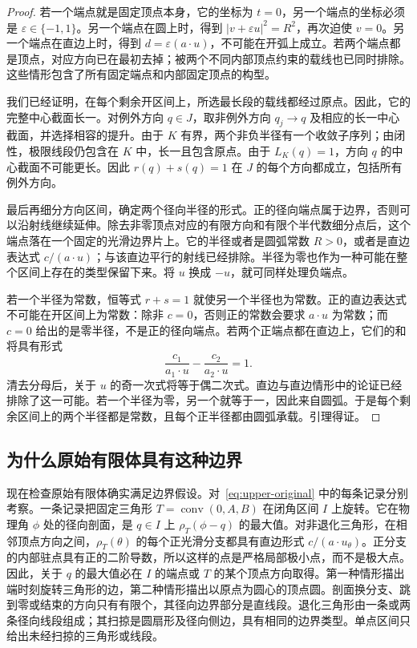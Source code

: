 \begin{proof}
若一个端点就是固定顶点本身，它的坐标为 $t=0$，另一个端点的坐标必须是 $\varepsilon\in\{-1,1\}$。另一个端点在圆上时，得到 $|v+\varepsilon u|^2=R^2$，再次迫使 $v=0$。另一个端点在直边上时，得到 $d=\varepsilon(a\cdot u)$，不可能在开弧上成立。若两个端点都是顶点，对应方向已在最初去掉；被两个不同内部顶点约束的载线也已同时排除。这些情形包含了所有固定端点和内部固定顶点的构型。

我们已经证明，在每个剩余开区间上，所选最长段的载线都经过原点。因此，它的完整中心截面长一。对例外方向 $q\in J$，取非例外方向 $q_j\to q$ 及相应的长一中心截面，并选择相容的提升。由于 $K$ 有界，两个非负半径有一个收敛子序列；由闭性，极限线段仍包含在 $K$ 中，长一且包含原点。由于 $L_K(q)=1$，方向 $q$ 的中心截面不可能更长。因此 $r(q)+s(q)=1$ 在 $J$ 的每个方向都成立，包括所有例外方向。

最后再细分方向区间，确定两个径向半径的形式。正的径向端点属于边界，否则可以沿射线继续延伸。除去非零顶点对应的有限方向和有限个半代数细分点后，这个端点落在一个固定的光滑边界片上。它的半径或者是圆弧常数 $R>0$，或者是直边表达式 $c/(a\cdot u)$；与该直边平行的射线已经排除。半径为零也作为一种可能在整个区间上存在的类型保留下来。将 $u$ 换成 $-u$，就可同样处理负端点。

若一个半径为常数，恒等式 $r+s=1$ 就使另一个半径也为常数。正的直边表达式不可能在开区间上为常数：除非 $c=0$，否则正的常数会要求 $a\cdot u$ 为常数；而 $c=0$ 给出的是零半径，不是正的径向端点。若两个正端点都在直边上，它们的和将具有形式
\[
 \frac{c_1}{a_1\cdot u}-\frac{c_2}{a_2\cdot u}=1.
\]
清去分母后，关于 $u$ 的奇一次式将等于偶二次式。直边与直边情形中的论证已经排除了这一可能。若一个半径为零，另一个就等于一，因此来自圆弧。于是每个剩余区间上的两个半径都是常数，且每个正半径都由圆弧承载。引理得证。
\end{proof}

\subsection*{为什么原始有限体具有这种边界}
现在检查原始有限体确实满足边界假设。对~\eqref{eq:upper-original} 中的每条记录分别考察。一条记录把固定三角形 $T=\operatorname{conv}(0,A,B)$ 在闭角区间 $I$ 上旋转。它在物理角 $\phi$ 处的径向剖面，是 $q\in I$ 上 $\rho_T(\phi-q)$ 的最大值。对非退化三角形，在相邻顶点方向之间，$\rho_T(\theta)$ 的每个正光滑分支都具有直边形式 $c/(a\cdot u_\theta)$。正分支的内部驻点具有正的二阶导数，所以这样的点是严格局部极小点，而不是极大点。因此，关于 $q$ 的最大值必在 $I$ 的端点或 $T$ 的某个顶点方向取得。第一种情形描出端时刻旋转三角形的边，第二种情形描出以原点为圆心的顶点圆。剖面换分支、跳到零或结束的方向只有有限个，其径向边界部分是直线段。退化三角形由一条或两条径向线段组成；其扫掠是圆扇形及径向侧边，具有相同的边界类型。单点区间只给出未经扫掠的三角形或线段。

